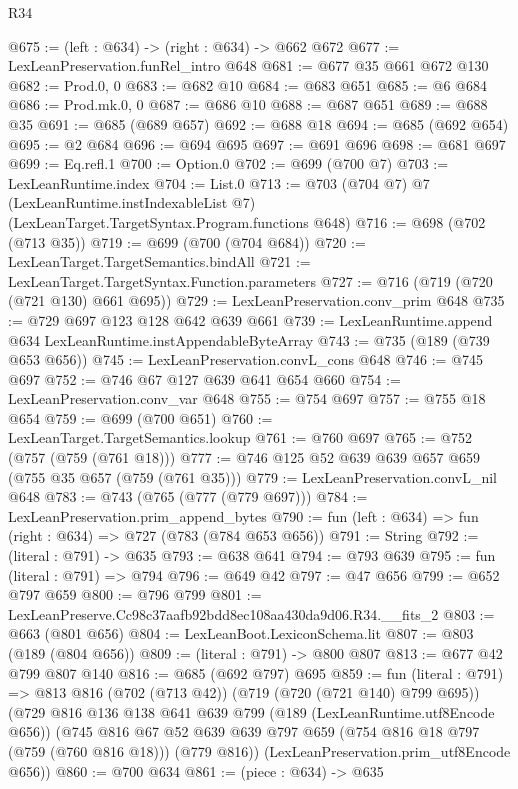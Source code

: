 \begin{lexlean}{R34}
\begin{coremodule}
@675 := (left : @634) -> (right : @634) -> @662 @672
@677 := LexLeanPreservation.funRel_intro @648
@681 := @677 @35 @661 @672 @130
@682 := Prod.{0, 0}
@683 := @682 @10
@684 := @683 @651
@685 := @6 @684
@686 := Prod.mk.{0, 0}
@687 := @686 @10
@688 := @687 @651
@689 := @688 @35
@691 := @685 (@689 @657)
@692 := @688 @18
@694 := @685 (@692 @654)
@695 := @2 @684
@696 := @694 @695
@697 := @691 @696
@698 := @681 @697
@699 := Eq.refl.{1}
@700 := Option.{0}
@702 := @699 (@700 @7)
@703 := LexLeanRuntime.index
@704 := List.{0}
@713 := @703
    (@704 @7)
    @7
    (LexLeanRuntime.instIndexableList @7)
    (LexLeanTarget.TargetSyntax.Program.functions @648)
@716 := @698 (@702 (@713 @35))
@719 := @699 (@700 (@704 @684))
@720 := LexLeanTarget.TargetSemantics.bindAll
@721 := LexLeanTarget.TargetSyntax.Function.parameters
@727 := @716 (@719 (@720 (@721 @130) @661 @695))
@729 := LexLeanPreservation.conv_prim @648
@735 := @729 @697 @123 @128 @642 @639 @661
@739 := LexLeanRuntime.append @634 LexLeanRuntime.instAppendableByteArray
@743 := @735 (@189 (@739 @653 @656))
@745 := LexLeanPreservation.convL_cons @648
@746 := @745 @697
@752 := @746 @67 @127 @639 @641 @654 @660
@754 := LexLeanPreservation.conv_var @648
@755 := @754 @697
@757 := @755 @18 @654
@759 := @699 (@700 @651)
@760 := LexLeanTarget.TargetSemantics.lookup
@761 := @760 @697
@765 := @752 (@757 (@759 (@761 @18)))
@777 := @746 @125 @52 @639 @639 @657 @659 (@755 @35 @657 (@759 (@761 @35)))
@779 := LexLeanPreservation.convL_nil @648
@783 := @743 (@765 (@777 (@779 @697)))
@784 := LexLeanPreservation.prim_append_bytes
@790 := fun (left : @634) => fun (right : @634) => @727 (@783 (@784 @653 @656))
@791 := String
@792 := (literal : @791) -> @635
@793 := @638 @641
@794 := @793 @639
@795 := fun (literal : @791) => @794
@796 := @649 @42
@797 := @47 @656
@799 := @652 @797 @659
@800 := @796 @799
@801 := LexLeanPreserve.Cc98c37aafb92bdd8ec108aa430da9d06.R34.__fits_2
@803 := @663 (@801 @656)
@804 := LexLeanBoot.LexiconSchema.lit
@807 := @803 (@189 (@804 @656))
@809 := (literal : @791) -> @800 @807
@813 := @677 @42 @799 @807 @140
@816 := @685 (@692 @797) @695
@859 := fun (literal : @791) =>
  @813
    @816
    (@702 (@713 @42))
    (@719 (@720 (@721 @140) @799 @695))
    (@729
      @816
      @136
      @138
      @641
      @639
      @799
      (@189 (LexLeanRuntime.utf8Encode @656))
      (@745
        @816
        @67
        @52
        @639
        @639
        @797
        @659
        (@754 @816 @18 @797 (@759 (@760 @816 @18)))
        (@779 @816))
      (LexLeanPreservation.prim_utf8Encode @656))
@860 := @700 @634
@861 := (piece : @634) -> @635

\end{coremodule}
\end{lexlean}
